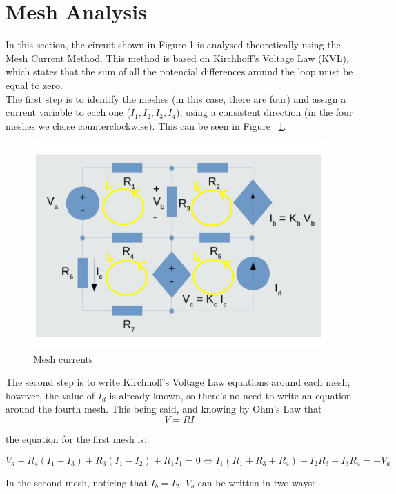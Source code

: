 \section{Mesh Analysis}
\label{sec:mesh analysis}

In this section, the circuit shown in Figure 1 is analysed theoretically using the Mesh Current Method. This method is based on Kirchhoff's Voltage Law (KVL), which states that the sum of all the potencial differences around the loop must be equal to zero.\\
The first step is to identify the meshes (in this case, there are four) and assign a current variable to each one ($I_1, I_2, I_3, I_4$), using a consistent direction (in the four meshes we chose counterclockwise). This can be seen in Figure ~\ref{fig:mesh}.\\

\begin{figure}[H] \centering
\includegraphics[width=0.7\linewidth]{meshcircuit.pdf}
\caption{Mesh currents}
\label{fig:mesh}
\end{figure}


The second step is to write Kirchhoff's Voltage Law equations around each mesh; however, the value of $I_d$ is already known, so there's no need to write an equation around the fourth mesh. This being said, and knowing by Ohm's Law that
\begin{equation}
  V=RI
\end{equation}

the equation for the first mesh is:

\begin{equation}
  V_a + R_4(I_1 - I_3) + R_3(I_1 - I_2) + R_1I_1 = 0 \Leftrightarrow I_1(R_1+R_3+R_4) - I_2R_3 - I_3R_4 = -V_a
  \label{eq:kvl}
\end{equation}

In the second mesh, noticing that $I_b=I_2$, $V_b$ can be written in two ways:

